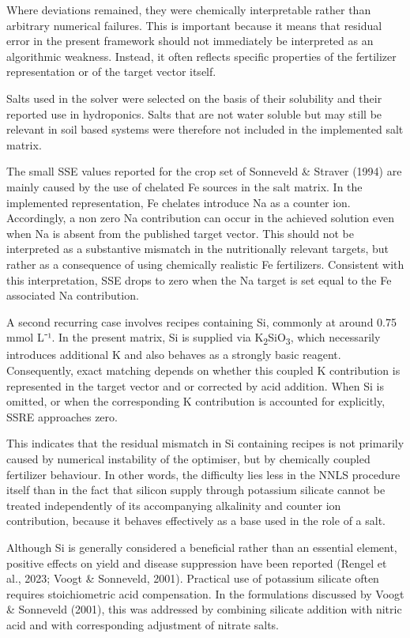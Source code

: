 \documentclass[
  letterpaper,
  DIV=11,
  numbers=noendperiod]{scrreprt}
\begin{document}
Where deviations remained, they were chemically interpretable rather
than arbitrary numerical failures. This is important because it means
that residual error in the present framework should not immediately be
interpreted as an algorithmic weakness. Instead, it often reflects
specific properties of the fertilizer representation or of the target
vector itself.

Salts used in the solver were selected on the basis of their solubility
and their reported use in hydroponics. Salts that are not water soluble
but may still be relevant in soil based systems were therefore not
included in the implemented salt matrix.

The small SSE values reported for the crop set of Sonneveld \& Straver
(1994) are mainly caused by the use of chelated Fe sources in the salt
matrix. In the implemented representation, Fe chelates introduce Na as a
counter ion. Accordingly, a non zero Na contribution can occur in the
achieved solution even when Na is absent from the published target
vector. This should not be interpreted as a substantive mismatch in the
nutritionally relevant targets, but rather as a consequence of using
chemically realistic Fe fertilizers. Consistent with this
interpretation, SSE drops to zero when the Na target is set equal to the
Fe associated Na contribution.

A second recurring case involves recipes containing Si, commonly at
around 0.75 mmol L⁻¹. In the present matrix, Si is supplied via
K\textsubscript{2}SiO\textsubscript{3}, which necessarily introduces
additional K and also behaves as a strongly basic reagent. Consequently,
exact matching depends on whether this coupled K contribution is
represented in the target vector and or corrected by acid addition. When
Si is omitted, or when the corresponding K contribution is accounted for
explicitly, SSRE approaches zero.

This indicates that the residual mismatch in Si containing recipes is
not primarily caused by numerical instability of the optimiser, but by
chemically coupled fertilizer behaviour. In other words, the difficulty
lies less in the NNLS procedure itself than in the fact that silicon
supply through potassium silicate cannot be treated independently of its
accompanying alkalinity and counter ion contribution, because it behaves
effectively as a base used in the role of a salt.

Although Si is generally considered a beneficial rather than an
essential element, positive effects on yield and disease suppression
have been reported (Rengel et al., 2023; Voogt \& Sonneveld, 2001).
Practical use of potassium silicate often requires stoichiometric acid
compensation. In the formulations discussed by Voogt \& Sonneveld
(2001), this was addressed by combining silicate addition with nitric
acid and with corresponding adjustment of nitrate salts.
\end{document}
